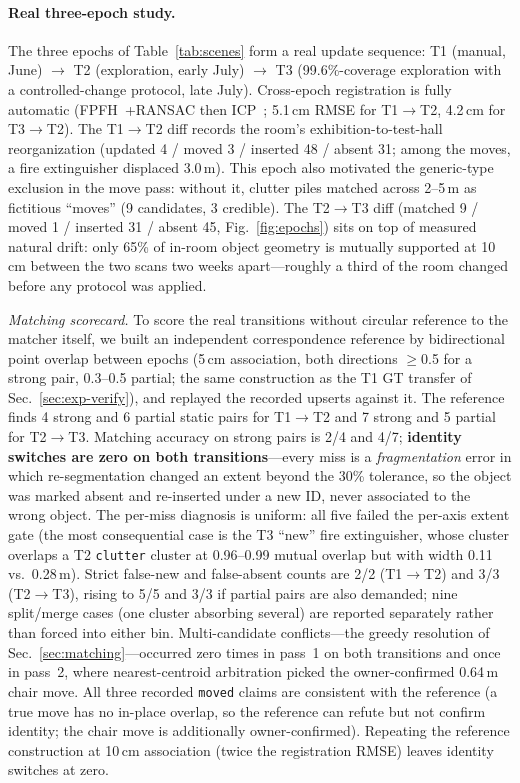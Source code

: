 \paragraph{Real three-epoch study.}
The three epochs of Table~\ref{tab:scenes} form a real update sequence:
T1 (manual, June) $\rightarrow$ T2 (exploration, early July) $\rightarrow$
T3 (99.6\%-coverage exploration with a controlled-change protocol, late
July). Cross-epoch registration is fully automatic
(FPFH~\cite{rusu2009fpfh}+RANSAC then ICP~\cite{besl1992icp};
5.1\,cm RMSE for T1$\rightarrow$T2, 4.2\,cm for T3$\rightarrow$T2). The
T1$\rightarrow$T2 diff records the room's exhibition-to-test-hall
reorganization (updated 4 / moved 3 / inserted 48 / absent 31; among the
moves, a fire extinguisher displaced 3.0\,m). This epoch also motivated the
generic-type exclusion in the move pass: without it, clutter piles matched
across 2--5\,m as fictitious ``moves'' (9 candidates, 3 credible).
The T2$\rightarrow$T3 diff (matched 9 / moved 1 / inserted 31 / absent 45,
Fig.~\ref{fig:epochs}) sits on top of measured natural drift: only 65\% of
in-room object geometry is mutually supported at 10\,cm between the two
scans two weeks apart---roughly a third of the room changed before any
protocol was applied.

\emph{Matching scorecard.} To score the real transitions without circular
reference to the matcher itself, we built an independent correspondence
reference by bidirectional point overlap between epochs (5\,cm
association, both directions $\ge$0.5 for a strong pair, 0.3--0.5
partial; the same construction as the T1 GT transfer of
Sec.~\ref{sec:exp-verify}), and replayed the recorded upserts against it.
The reference finds 4 strong and 6 partial static pairs for
T1$\rightarrow$T2 and 7 strong and 5 partial for T2$\rightarrow$T3.
Matching accuracy on strong pairs is 2/4 and 4/7; \textbf{identity
switches are zero on both transitions}---every miss is a
\emph{fragmentation} error in which re-segmentation changed an extent
beyond the 30\% tolerance, so the object was marked absent and
re-inserted under a new ID, never associated to the wrong object. The
per-miss diagnosis is uniform: all five failed the per-axis extent gate
(the most consequential case is the T3 ``new'' fire extinguisher, whose
cluster overlaps a T2 \texttt{clutter} cluster at 0.96--0.99 mutual
overlap but with width 0.11 vs.\ 0.28\,m). Strict false-new and
false-absent counts are 2/2 (T1$\rightarrow$T2) and 3/3
(T2$\rightarrow$T3), rising to 5/5 and 3/3 if partial pairs are also
demanded; nine split/merge cases (one cluster absorbing several) are
reported separately rather than forced into either bin. Multi-candidate
conflicts---the greedy resolution of Sec.~\ref{sec:matching}---occurred
zero times in pass~1 on both transitions and once in pass~2, where
nearest-centroid arbitration picked the owner-confirmed 0.64\,m chair
move. All three recorded \texttt{moved} claims are consistent with the
reference (a true move has no in-place overlap, so the reference can
refute but not confirm identity; the chair move is additionally
owner-confirmed). Repeating the reference construction at 10\,cm
association (twice the registration RMSE) leaves identity switches at
zero.

